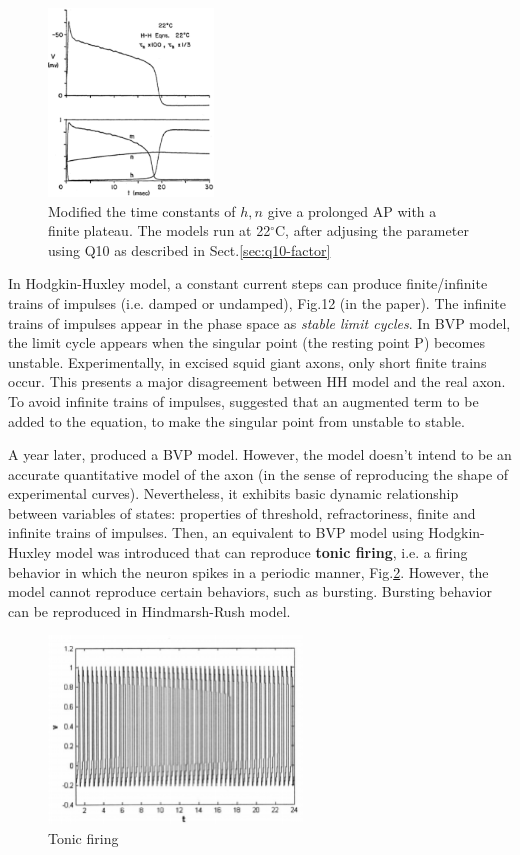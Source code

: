\begin{figure}[htb]
  \centerline{\includegraphics[height=5cm]{./images/FitzHugh1960_plateauVm.eps}}
  \caption{Modified the time constants of $h,n$ give a prolonged AP with a
  finite plateau. The models run at 22$^\circ$C, after adjusing the parameter
  using Q10 as described in Sect.\ref{sec:q10-factor}}
  \label{fig:FN_plateauVm}
\end{figure}
 
In Hodgkin-Huxley model, a constant current steps can produce finite/infinite
trains of impulses (i.e. damped or undamped), Fig.12 (in the paper). The
infinite trains of impulses appear in the phase space as {\it stable limit
cycles}. In BVP model, the limit cycle appears when the singular point (the
resting point P) becomes unstable. Experimentally, in excised squid giant axons,
only short finite trains occur. This presents a major disagreement between HH
model and the real axon. To avoid infinite trains of impulses,
\citep{fitzhugh1961ips} suggested that an augmented term to be added to the
equation, to make the singular point from unstable to stable. 

A year later, \citep{fitzhugh1961ips} produced a BVP model. However, the model
doesn't intend to be an accurate quantitative model of the axon (in the sense
of reproducing the shape of experimental curves). Nevertheless, it exhibits
basic dynamic relationship between variables of states: properties of threshold,
refractoriness, finite and infinite trains of impulses. Then, an equivalent
to BVP model using Hodgkin-Huxley model was introduced that can reproduce {\bf
tonic firing}, i.e. a firing behavior in which the neuron spikes in a periodic
manner, Fig.\ref{fig:tonic_firing}. However, the model cannot reproduce certain
behaviors, such as bursting. Bursting behavior can be reproduced in
Hindmarsh-Rush model.
 

\begin{figure}[htb]
  \centerline{\includegraphics[height=5cm]{./images/tonic_firing.eps}}
  \caption{Tonic firing}
  \label{fig:tonic_firing}
\end{figure}
 
